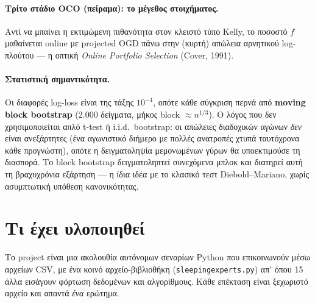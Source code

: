 \documentclass[11pt,a4paper]{article}
\newcommand{\file}[1]{\texttt{#1}}
\renewcommand{\_}{\oldunderscore\allowbreak}
\begin{document}
\paragraph{Τρίτο στάδιο OCO (πείραμα): το μέγεθος στοιχήματος.} Αντί να μπαίνει η
εκτιμώμενη πιθανότητα στον κλειστό τύπο Kelly, το ποσοστό $f$ μαθαίνεται online με projected
OGD πάνω στην (κυρτή) απώλεια αρνητικού log-πλούτου --- η οπτική \emph{Online Portfolio
Selection} (Cover, 1991).

\paragraph{Στατιστική σημαντικότητα.} Οι διαφορές log-loss είναι της τάξης $10^{-4}$, οπότε
κάθε σύγκριση περνά από \textbf{moving block bootstrap} (2.000 δείγματα, μήκος block
$\approx n^{1/3}$). Ο λόγος που δεν χρησιμοποιείται απλό t-test ή i.i.d.\ bootstrap: οι
απώλειες διαδοχικών αγώνων \emph{δεν} είναι ανεξάρτητες (ένα αγωνιστικό διήμερο με πολλές
ανατροπές χτυπά ταυτόχρονα κάθε προγνώστη), οπότε η δειγματοληψία μεμονωμένων γύρων θα
υποεκτιμούσε τη διασπορά. Το block bootstrap δειγματοληπτεί συνεχόμενα μπλοκ και διατηρεί
αυτή τη βραχυχρόνια εξάρτηση --- η ίδια ιδέα με το κλασικό τεστ Diebold--Mariano, χωρίς
ασυμπτωτική υπόθεση κανονικότητας.

\section{Τι έχει υλοποιηθεί}

Το project είναι μια ακολουθία αυτόνομων σεναρίων Python που επικοινωνούν μέσω αρχείων CSV,
με ένα κοινό αρχείο-βιβλιοθήκη (\file{sleeping\_experts.py}) απ' όπου 15 άλλα εισάγουν
φόρτωση δεδομένων και αλγορίθμους. Κάθε επέκταση είναι ξεχωριστό αρχείο και απαντά
\emph{ένα} ερώτημα.
\end{document}
